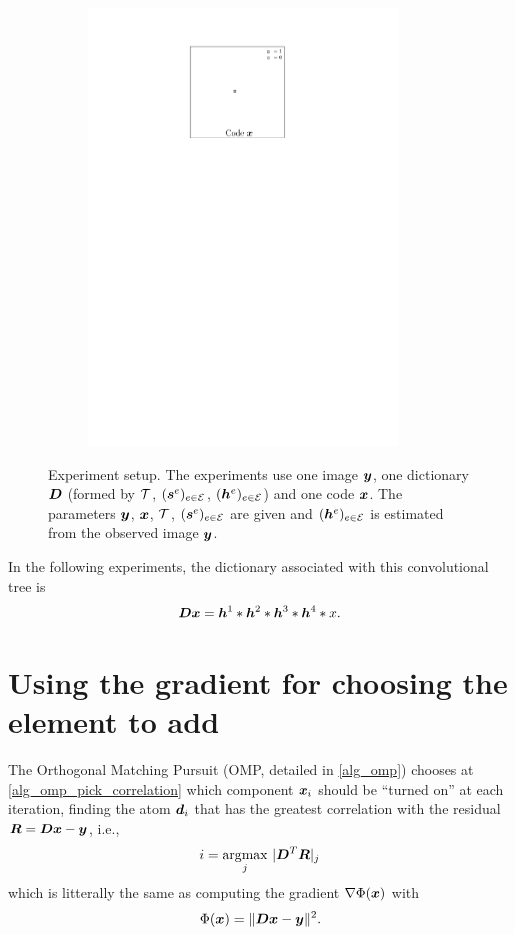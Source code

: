 \begin{figure}[!ht]
\begin{subfigure}[b]{0.32\textwidth}
	\includegraphics[width=0.9\textwidth]{figures/xp_explain/code.pdf}
	\caption{}
\end{subfigure}
\caption{Experiment setup. The experiments use one image $\bm{y}$, one dictionary $\bm{D}$ (formed by $\mathcal T$, $(\bm{s}^e)_{e \in \mathcal E}$, $(\bm{h}^e)_{e \in \mathcal E}$) and one code $\bm{x}$. The parameters $\bm{y}$, $\bm{x}$, $\mathcal T$, $(\bm{s}^e)_{e \in \mathcal E}$ are given and $(\bm{h}^e)_{e \in \mathcal E}$ is estimated from the observed image $\bm{y}$.}\label{fig_xp_explain}
\end{figure}
In the following experiments, the dictionary associated with this convolutional tree is 
\begin{equation*}\bm{D}\bm{x} = \bm{h}^1 * \bm{h}^2 * \bm{h}^3 * \bm{h}^4 * x.\end{equation*}

\section{Using the gradient for choosing the element to add}

The Orthogonal Matching Pursuit (\ac{OMP}, detailed in \cref{alg_omp}) chooses at \cref{alg_omp_pick_correlation} which component $\bm{x}_i$ should be “turned on” at each iteration, finding the atom $\bm{d}_i$ that has the greatest correlation with the residual $\bm{R} = \bm{D}\bm{x} - \bm{y}$, i.e.,
\begin{equation*} i = \underset{j}{\operatorname*{\arg\!\max}} ~ | \bm{D}^T \bm{R} |_j \end{equation*}
which is litterally the same as computing the gradient $\nabla \Phi(\bm{x})$ with \begin{equation*}\Phi(\bm{x}) = \lVert \bm{D}\bm{x} - \bm{y} \rVert^2.\end{equation*}

